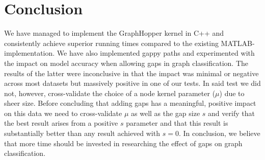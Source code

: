 \documentclass{article}
\begin{document}
\section{Conclusion}
We have managed to implement the GraphHopper kernel in C++ and consistently achieve superior running times compared to the existing MATLAB-implementation. We have also implemented gappy paths and experimented with the impact on model accuracy when allowing gaps in graph classification. The results of the latter were inconclusive in that the impact was minimal or negative across most datasets but massively positive in one of our tests. In said test we did not, however, cross-validate the choice of a node kernel parameter ($\mu$) due to sheer size. Before concluding that adding gaps has a meaningful, positive impact on this data we need to cross-validate $\mu$ as well as the gap size $s$ and verify that the best result arises from a positive $s$ parameter and that this result is substantially better than any result achieved with $s=0$. In conclusion, we believe that more time should be invested in researching the effect of gaps on graph classification.


\newpage
\end{document}
